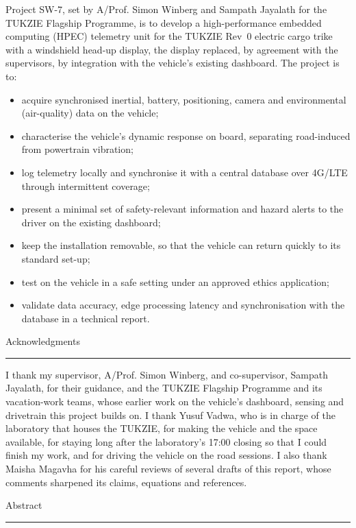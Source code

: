 \documentclass[a4paper,11pt]{report}
\begin{document}
{Project SW-7, set by A/Prof. Simon Winberg and Sampath Jayalath for the TUKZIE Flagship Programme, is to develop a high-performance embedded computing (HPEC) telemetry unit for the TUKZIE Rev~0 electric cargo trike with a windshield head-up display, the display replaced, by agreement with the supervisors, by integration with the vehicle's existing dashboard. The project is to:
\begin{itemize}
\item acquire synchronised inertial, battery, positioning, camera and environmental (air-quality) data on the vehicle;
\item characterise the vehicle's dynamic response on board, separating road-induced from powertrain vibration;
\item log telemetry locally and synchronise it with a central database over 4G/LTE through intermittent coverage;
\item present a minimal set of safety-relevant information and hazard alerts to the driver on the existing dashboard;
\item keep the installation removable, so that the vehicle can return quickly to its standard set-up;
\item test on the vehicle in a safe setting under an approved ethics application;
\item validate data accuracy, edge processing latency and synchronisation with the database in a technical report.
\end{itemize}


\fancyfoot[C]{\thepage}
\pagestyle{plain}
\newpage
{}
{\Large Acknowledgments}\\
\hrule
I thank my supervisor, A/Prof. Simon Winberg, and co-supervisor, Sampath Jayalath, for their guidance, and the TUKZIE Flagship Programme and its vacation-work teams, whose earlier work on the vehicle's dashboard, sensing and drivetrain this project builds on. I thank Yusuf Vadwa, who is in charge of the laboratory that houses the TUKZIE, for making the vehicle and the space available, for staying long after the laboratory's 17:00 closing so that I could finish my work, and for driving the vehicle on the road sessions. I also thank Maisha Magavha for his careful reviews of several drafts of this report, whose comments sharpened its claims, equations and references.


\newpage

{\Large Abstract}\\
\hrule

}
\end{document}

